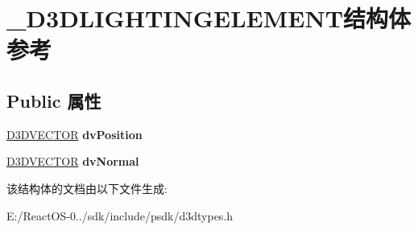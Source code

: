 \hypertarget{struct___d3_d_l_i_g_h_t_i_n_g_e_l_e_m_e_n_t}{}\section{\+\_\+\+D3\+D\+L\+I\+G\+H\+T\+I\+N\+G\+E\+L\+E\+M\+E\+N\+T结构体 参考}
\label{struct___d3_d_l_i_g_h_t_i_n_g_e_l_e_m_e_n_t}
\subsection*{Public 属性}
\begin{DoxyCompactItemize}
\item 
\mbox{\label{struct___d3_d_l_i_g_h_t_i_n_g_e_l_e_m_e_n_t_a844eaab9eeffff4a4ba1870de931fbdb}} 
\hyperlink{struct___d3_d_v_e_c_t_o_r}{D3\+D\+V\+E\+C\+T\+OR} {\bfseries dv\+Position}
\item 
\mbox{\label{struct___d3_d_l_i_g_h_t_i_n_g_e_l_e_m_e_n_t_ad6d26551768c16cdc2d670c1b49d94b1}} 
\hyperlink{struct___d3_d_v_e_c_t_o_r}{D3\+D\+V\+E\+C\+T\+OR} {\bfseries dv\+Normal}
\end{DoxyCompactItemize}


该结构体的文档由以下文件生成\+:\begin{DoxyCompactItemize}
\item 
E\+:/\+React\+O\+S-\/0../sdk/include/psdk/d3dtypes.\+h\end{DoxyCompactItemize}
